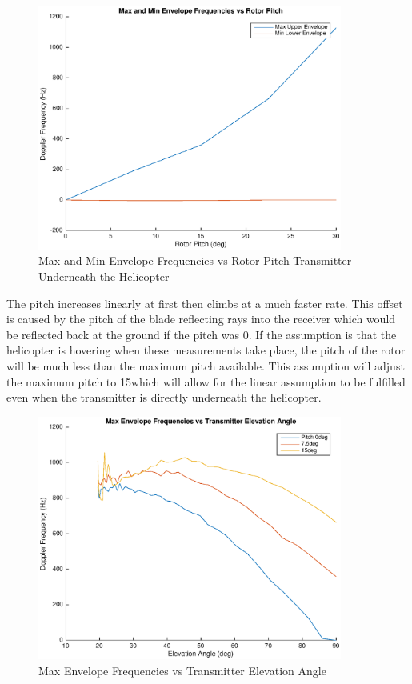 \begin{figure}
	\begin{center}
		\includegraphics[width=10cm]{images/simulation/pitch_0txPos_max_doppler.eps}
		\caption{Max and Min Envelope Frequencies vs Rotor Pitch Transmitter Underneath the Helicopter}
		\label{fig:pitch_tx0}
	\end{center}
\end{figure}

The pitch increases linearly at first then climbs at a much faster rate. This offset is caused by the pitch of the blade reflecting rays into the receiver which would be reflected back at the ground if the pitch was 0\textdegree. If the assumption is that the helicopter is hovering when these measurements take place, the pitch of the rotor will be much less than the maximum pitch available. This assumption will adjust the maximum pitch to 15\textdegree \space which will allow for the linear assumption to be fulfilled even when the transmitter is directly underneath the helicopter.

\begin{figure}
	\begin{center}
		\includegraphics[width=10cm]{images/simulation/elevation_angle_with_pitch_max_doppler.eps}
		\caption{Max Envelope Frequencies vs Transmitter Elevation Angle}
		\label{fig:pitch_tx_elevation_angle}
	\end{center}
\end{figure}


